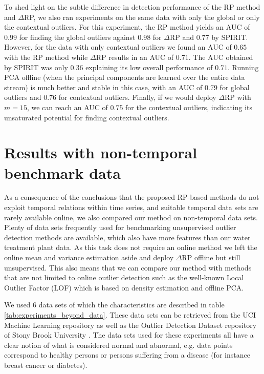 To shed light on the subtle difference in detection performance of the RP method and $\Delta$RP, we also ran experiments on the same data with only the global or only the contextual outliers. For this experiment, the RP method yields an AUC of $0.99$ for finding the global outliers against $0.98$ for $\Delta$RP and $0.77$ by SPIRIT. However, for the data with only contextual outliers we found an AUC of $0.65$ with the RP method while $\Delta$RP results in an AUC of $0.71$. The AUC obtained by SPIRIT was only $0.36$ explaining its low overall performance of $0.71$. Running PCA offline (when the principal components are learned over the entire data stream) is much better and stable in this case, with an AUC of $0.79$ for global outliers and $0.76$ for contextual outliers. Finally, if we would deploy $\Delta$RP with $m=15$, we can reach an AUC of $0.75$ for the contextual outliers, indicating its unsaturated potential for finding contextual outliers.


\section{Results with non-temporal benchmark data}
\label{sec:experiments_beyond}

As a consequence of the conclusions that the proposed RP-based methods do not exploit temporal relations within time series, and suitable temporal data sets are rarely available online, we also compared our method on non-temporal data sets. Plenty of data sets frequently used for benchmarking unsupervised outlier detection methods are available, which also have more features than our water treatment plant data. As this task does not require an online method we left the online mean and variance estimation aside and deploy $\Delta$RP offline but still unsupervised. This also means that we can compare our method with methods that are not limited to online outlier detection such as the well-known Local Outlier Factor (LOF) which is based on density estimation \cite{breunig2000lof} and offline PCA.

We used $6$ data sets of which the characteristics are described in table \ref{tab:experiments_beyond_data}. These data sets can be retrieved from the UCI Machine Learning repository \cite{uci2018data} as well as the Outlier Detection Dataset repository of Stony Brook University \cite{odds2016}. The data sets used for these experiments all have a clear notion of what is considered normal and abnormal, e.g. data points correspond to healthy persons or persons suffering from a disease (for instance breast cancer or diabetes). 


